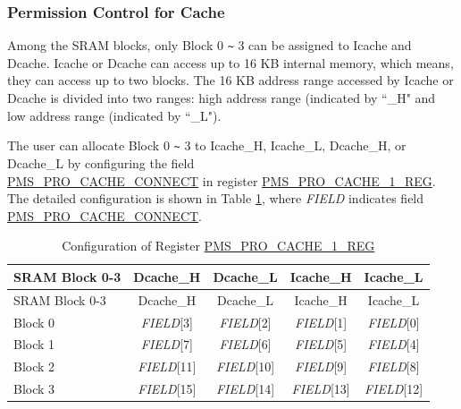 \documentclass[main\_\_EN.tex]{subfiles}
\begin{document}
\subsubsection{Permission Control for Cache}
Among the SRAM blocks, only Block 0 \verb+~+ 3 can be assigned to Icache and Dcache. Icache or Dcache can access up to 16 KB internal memory, which means, they can access up to two blocks. The 16 KB address range accessed by Icache or Dcache is divided into two ranges: high address range (indicated by ``\_H" and low address range (indicated by ``\_L").

The user can allocate Block 0 \verb+~+ 3 to Icache\_H, Icache\_L, Dcache\_H, or Dcache\_L by configuring the field\\ \hyperref[fielddesc:PMSPROCACHECONNECT]{PMS\_PRO\_CACHE\_CONNECT} in register \hyperref[regdesc:PMSPROCACHE1REG]{PMS\_PRO\_CACHE\_1\_REG}. The detailed configuration is shown in Table \ref{SRAMBlock0-3}, where \textit{FIELD} indicates field \hyperref[fielddesc:PMSPROCACHECONNECT]{PMS\_PRO\_CACHE\_CONNECT}.

\begin{small}
\begin{longtable}[c]{|m{3cm}|c|c|c|c|}
    \caption{Configuration of Register \hyperref[regdesc:PMSPROCACHE1REG]{PMS\_PRO\_CACHE\_1\_REG}}
    \label{SRAMBlock0-3}
    \\\hline
    \rowcolor{lightgray}
    SRAM Block 0-3 & Dcache\_H & Dcache\_L &Icache\_H &Icache\_L \\
    \hline
    \endfirsthead
    \hline
    \rowcolor{lightgray}
    SRAM Block 0-3 & Dcache\_H & Dcache\_L &Icache\_H &Icache\_L \\
    \hline
    \endhead
    \endfoot
    \hline
    \endlastfoot

    Block 0 & \textit{FIELD}[3] & \textit{FIELD}[2] & \textit{FIELD}[1] &\textit{FIELD}[0]\\\hline

    Block 1 & \textit{FIELD}[7] & \textit{FIELD}[6] & \textit{FIELD}[5] &\textit{FIELD}[4]\\\hline

    Block 2 & \textit{FIELD}[11] & \textit{FIELD}[10] & \textit{FIELD}[9] &\textit{FIELD}[8]\\\hline

    Block 3 & \textit{FIELD}[15] & \textit{FIELD}[14] & \textit{FIELD}[13] &\textit{FIELD}[12]\\\hline

\end{longtable}
\end{small}
\end{document}
